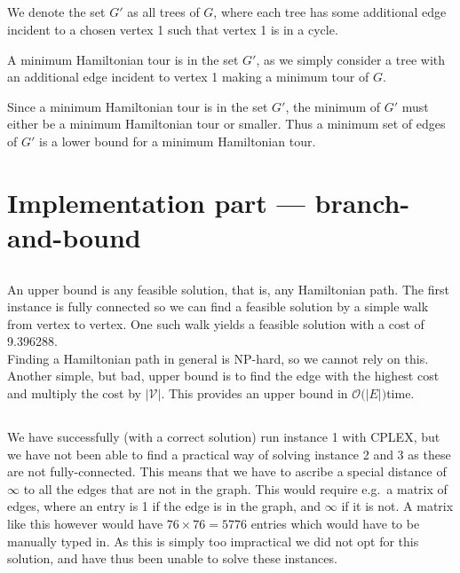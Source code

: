 \documentclass[11pt]{article}
\begin{document}
\subsection{}
We denote the set $G'$ as all trees of $G$, where each tree has some additional edge incident to a chosen vertex 1 such that vertex 1 is in a cycle. 

A minimum Hamiltonian tour is in the set $G'$, as we simply consider a tree with an additional edge incident to vertex 1 making a minimum tour of $G$.

Since a minimum Hamiltonian tour is in the set $G'$, the minimum of $G'$ must either be a minimum Hamiltonian tour or smaller. Thus a minimum set of edges of $G'$ is a lower bound for a minimum Hamiltonian tour.


\section*{Implementation part --- branch-and-bound}

\subsection{}
An upper bound is any feasible solution, that is, any Hamiltonian path. The
first instance is fully connected so we can find a feasible solution by a simple
walk from vertex to vertex. One such walk yields a feasible solution with a cost
of 9.396288. \\

Finding a Hamiltonian path in general is NP-hard, so we cannot rely on this.
Another simple, but bad, upper bound is to find the edge with the highest cost
and multiply the cost by $|\mathcal{V}|$. This provides an upper bound in
$\mathcal{O}\big(|E|\big)$time.

\subsection{}
We have successfully (with a correct solution) run instance 1 with CPLEX, but we have not been able to find a practical way of solving instance 2 and 3 as these are not fully-connected. This means that we have to ascribe a special distance of $\infty$ to all the edges that are not in the graph. This would require e.g.\ a matrix of edges, where an entry is 1 if the edge is in the graph, and $\infty$ if it is not. A matrix like this however would have $76 \times 76 = 5776$ entries which would have to be manually typed in. As this is simply too impractical we did not opt for this solution, and have thus been unable to solve these instances.
\end{document}
